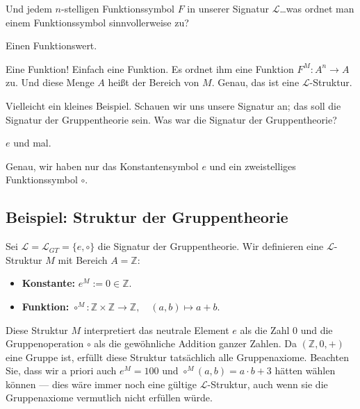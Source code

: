 \begin{spoken-clean}[00:41:30 - 00:42:00]
Und jedem $n$-stelligen Funktionssymbol $F$ in unserer Signatur $\mathcal{L}$\dots was ordnet man einem Funktionssymbol sinnvollerweise zu?
\end{spoken-clean}

\begin{student-interaction}
Einen Funktionswert.
\end{student-interaction}

\begin{spoken-clean}[00:42:00 - 00:42:50]
Eine Funktion! Einfach eine Funktion. Es ordnet ihm eine Funktion $F^M \colon A^n \to A$ zu. Und diese Menge $A$ heißt der Bereich von $M$. Genau, das ist eine $\mathcal{L}$-Struktur.

Vielleicht ein kleines Beispiel. Schauen wir uns unsere Signatur an; das soll die Signatur der Gruppentheorie sein. Was war die Signatur der Gruppentheorie?
\end{spoken-clean}

\begin{student-interaction}
$e$ und mal.
\end{student-interaction}

\begin{spoken-clean}[00:42:50 - 00:43:20]
Genau, wir haben nur das Konstantensymbol $e$ und ein zweistelliges Funktionssymbol $\circ$.
\end{spoken-clean}

\subsection{Beispiel: Struktur der Gruppentheorie}
\begin{math-stroke}
Sei $\mathcal{L} = \mathcal{L}_{GT} = \{e, \circ\}$ die Signatur der Gruppentheorie.
Wir definieren eine $\mathcal{L}$-Struktur $M$ mit Bereich $A = \mathbb{Z}$:
\begin{itemize}
    \item \textbf{Konstante:} $e^M := 0 \in \mathbb{Z}$.
    \item \textbf{Funktion:} $\circ^M \colon \mathbb{Z} \times \mathbb{Z} \to \mathbb{Z}, \quad (a, b) \mapsto a + b$.
\end{itemize}

\begin{explanation-of-steps}
Diese Struktur $M$ interpretiert das neutrale Element $e$ als die Zahl $0$ und die Gruppenoperation $\circ$ als die gewöhnliche Addition ganzer Zahlen. Da $(\mathbb{Z}, 0, +)$ eine Gruppe ist, erfüllt diese Struktur tatsächlich alle Gruppenaxiome. Beachten Sie, dass wir a priori auch $e^M = 100$ und $\circ^M(a, b) = a \cdot b + 3$ hätten wählen können --- dies wäre immer noch eine gültige $\mathcal{L}$-Struktur, auch wenn sie die Gruppenaxiome vermutlich nicht erfüllen würde.
\end{explanation-of-steps}
\end{math-stroke}

